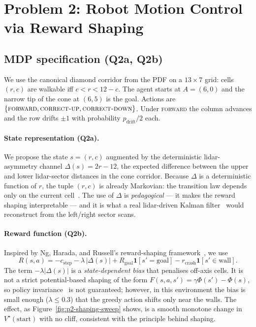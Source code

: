 \documentclass[11pt,letterpaper]{article}
\begin{document}
\section{Problem 2: Robot Motion Control via Reward Shaping}\label{sec:p2}
\subsection{MDP specification (Q2a, Q2b)}
We use the canonical diamond corridor from the PDF on a $13\times 7$ grid: cells $(r,c)$ are walkable iff $c<r<12-c$. The agent starts at $A=(6,0)$ and the narrow tip of the cone at $(6,5)$ is the goal. Actions are $\{\textsc{forward},\textsc{correct-up},\textsc{correct-down}\}$. Under \textsc{forward} the column advances and the row drifts $\pm 1$ with probability $p_{\textrm{drift}}/2$ each.

\paragraph{State representation (Q2a).} We propose the state $s=(r,c)$ augmented by the deterministic lidar-asymmetry channel $\Delta(s)=2r-12$, the expected difference between the upper and lower lidar-sector distances in the cone corridor. Because $\Delta$ is a deterministic function of $r$, the tuple $(r,c)$ is already Markovian: the transition law depends only on the current cell~\cite{sutton2018reinforcement}. The use of $\Delta$ is \emph{pedagogical} --- it makes the reward shaping interpretable --- and it is what a real lidar-driven Kalman filter~\cite{kalman1960new} would reconstruct from the left/right sector scans.

\paragraph{Reward function (Q2b).} Inspired by Ng, Harada, and Russell's reward-shaping framework~\cite{ng1999policy}, we use
\[
R(s,a) = -c_{\mathrm{step}}-\lambda\,|\Delta(s)|+R_{\mathrm{goal}}\mathbf{1}[s'=\mathrm{goal}]-r_{\mathrm{crash}}\mathbf{1}[s'\in\mathrm{wall}].
\]
The term $-\lambda|\Delta(s)|$ is a \emph{state-dependent bias} that penalises off-axis cells. It is not a strict potential-based shaping of the form $F(s,a,s') = \gamma\Phi(s')-\Phi(s)$, so policy invariance~\cite{ng1999policy} is not guaranteed; however, in this environment the bias is small enough ($\lambda\le 0.3$) that the greedy action shifts only near the walls. The effect, as Figure~\ref{fig:p2-shaping-sweep} shows, is a smooth monotone change in $V^{\star}(\mathrm{start})$ with no cliff, consistent with the principle behind shaping.
\end{document}
